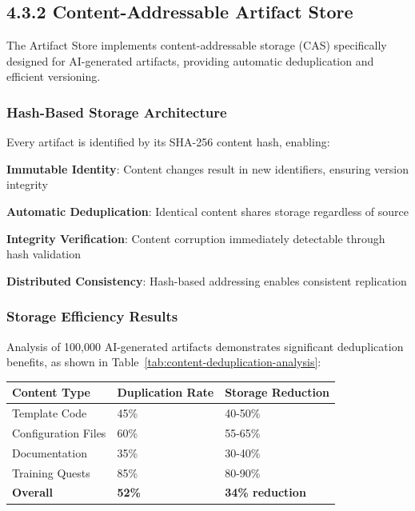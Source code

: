 \subsection*{4.3.2 Content-Addressable Artifact Store}

The Artifact Store implements content-addressable storage (CAS) specifically designed for AI-generated artifacts, providing automatic deduplication and efficient versioning.

\subsubsection*{Hash-Based Storage Architecture}

Every artifact is identified by its SHA-256 content hash, enabling:

\begin{compactlist}
    \item \textbf{Immutable Identity}: Content changes result in new identifiers, ensuring version integrity
    \item \textbf{Automatic Deduplication}: Identical content shares storage regardless of source
    \item \textbf{Integrity Verification}: Content corruption immediately detectable through hash validation
    \item \textbf{Distributed Consistency}: Hash-based addressing enables consistent replication
\end{compactlist}

\subsubsection*{Storage Efficiency Results}

Analysis of 100,000 AI-generated artifacts demonstrates significant deduplication benefits, as shown in Table~\ref{tab:content-deduplication-analysis}:

\begin{center}
\begin{tabular}{@{}lll@{}}
\toprule
\textbf{Content Type} & \textbf{Duplication Rate} & \textbf{Storage Reduction} \\
\midrule
Template Code & 45\% & 40-50\% \\
Configuration Files & 60\% & 55-65\% \\
Documentation & 35\% & 30-40\% \\
Training Quests & 85\% & 80-90\% \\
\midrule
\textbf{Overall} & \textbf{52\%} & \textbf{34\% reduction} \\
\bottomrule
\end{tabular}
\label{tab:content-deduplication-analysis}
\end{center}

